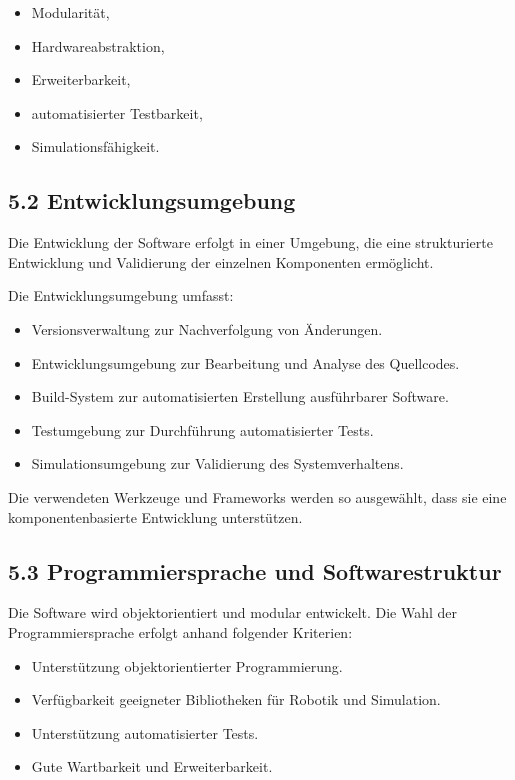 \documentclass[
]{article}
\providecommand{\tightlist}{%
  \setlength{\itemsep}{0pt}\setlength{\parskip}{0pt}}
\begin{document}
\begin{itemize}
\tightlist
\item
  Modularität,
\item
  Hardwareabstraktion,
\item
  Erweiterbarkeit,
\item
  automatisierter Testbarkeit,
\item
  Simulationsfähigkeit.
\end{itemize}

\subsection{5.2 Entwicklungsumgebung}\label{entwicklungsumgebung}

Die Entwicklung der Software erfolgt in einer Umgebung, die eine
strukturierte Entwicklung und Validierung der einzelnen Komponenten
ermöglicht.

Die Entwicklungsumgebung umfasst:

\begin{itemize}
\tightlist
\item
  Versionsverwaltung zur Nachverfolgung von Änderungen.
\item
  Entwicklungsumgebung zur Bearbeitung und Analyse des Quellcodes.
\item
  Build-System zur automatisierten Erstellung ausführbarer Software.
\item
  Testumgebung zur Durchführung automatisierter Tests.
\item
  Simulationsumgebung zur Validierung des Systemverhaltens.
\end{itemize}

Die verwendeten Werkzeuge und Frameworks werden so ausgewählt, dass sie
eine komponentenbasierte Entwicklung unterstützen.

\subsection{5.3 Programmiersprache und
Softwarestruktur}\label{programmiersprache-und-softwarestruktur}

Die Software wird objektorientiert und modular entwickelt. Die Wahl der
Programmiersprache erfolgt anhand folgender Kriterien:

\begin{itemize}
\tightlist
\item
  Unterstützung objektorientierter Programmierung.
\item
  Verfügbarkeit geeigneter Bibliotheken für Robotik und Simulation.
\item
  Unterstützung automatisierter Tests.
\item
  Gute Wartbarkeit und Erweiterbarkeit.
\end{itemize}
\end{document}
